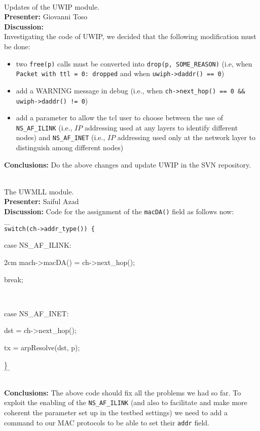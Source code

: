 \documentclass[11pt,journal,draftclsnofoot,onecolumn,twoside,letterpaper]{IEEEtran}
\theoremstyle{definition} \newtheorem{definition}[]{Definition}
\theoremstyle{theorem} \newtheorem{theorem}[]{Theorem}
\begin{document}
\  \\
 Updates of the UWIP module.\\
{\bf Presenter:} Giovanni Toso\\
{\bf Discussion:} \\
Investigating the code of UWIP, we decided that the following modification must be done:
\begin{itemize}
 \item two {\tt free(p)} calls must be converted into {\tt drop(p, SOME\_REASON)} (i.e, when {\tt Packet with ttl = 0: dropped} and when {\tt uwiph->daddr() == 0})
 \item add a WARNING message in debug (i.e., when {\tt ch->next\_hop() == 0 \&\& uwiph->daddr() != 0})
 \item add a parameter to allow the tcl user to choose between the use of {\tt NS\_AF\_ILINK} (i.e., $IP$ addressing used at any layers to identify different nodes) and {\tt NS\_AF\_INET} (i.e., $IP$ addressing used only at the network layer to distinguish among different nodes)
\end{itemize}
{\bf Conclusions:} Do the above changes and update UWIP in the SVN repository.  

\  \\
 The UWMLL module.\\
{\bf Presenter:} Saiful Azad\\
{\bf Discussion:} Code for the assignment of the {\tt macDA()} field as follows now:\\
{\tt $\dots$\\
 switch(ch->addr\_type()) \{\\
        \begin{description}
           \item case NS\_AF\_ILINK:
           \item {2cm} mach->macDA() = ch->next\_hop();
	   \item break;
           \item \ 
	   \item case NS\_AF\_INET:
	   \item dst = ch->next\_hop();
	   \item tx = arpResolve(dst, p);
        \end{description}
	\}\\
$\dots$ } \\
{\bf Conclusions:} The above code should fix all the problems we had so far. To exploit the enabling of the {\tt NS\_AF\_ILINK} (and also to facilitate and make more coherent the parameter set up in the testbed settings) we need to add a command to our MAC protocols to be able to set their {\tt addr} field.
\end{document}
